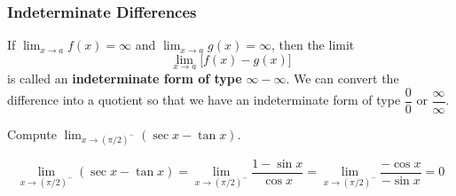 \subsubsection*{Indeterminate Differences}
If \(\displaystyle{\lim_{x\to a}f(x)=\infty}\) and
\(\displaystyle{\lim_{x\to a}g(x)=\infty}\), then the limit
\[\lim_{x\to a}\bigl[f(x)-g(x)\bigr]\]
is called an \textbf{indeterminate form of type} \(\infty-\infty\).
We can convert the difference into a quotient so that we have an indeterminate
form of type \(\dfrac{0}{0}\) or \(\dfrac{\infty}{\infty}\).
\begin{problem}
    Compute \(\displaystyle{\lim_{x\to (\pi/2)^-}(\sec x-\tan x)}\).
\end{problem}
\begin{solution}
    \[\lim_{x\to (\pi/2)^-}(\sec x-\tan x)
    =\lim_{x\to (\pi/2)^-}\frac{1-\sin x}{\cos x}
    =\lim_{x\to (\pi/2)^-}\frac{-\cos x}{-\sin x}=0\]
\end{solution}


